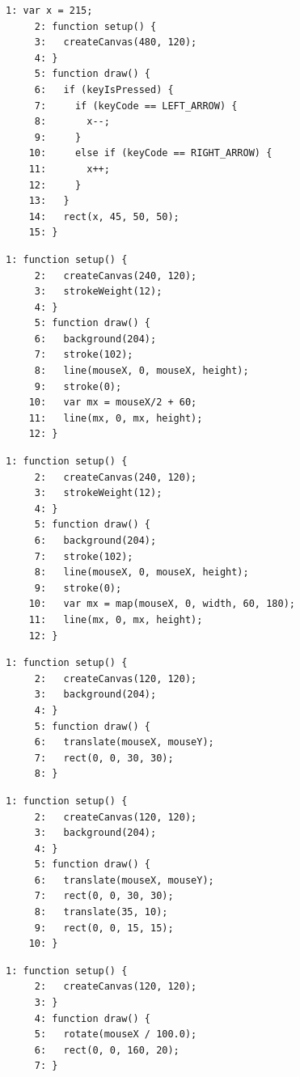 \documentclass[a4j]{ltjsarticle}
\begin{document}
\vspace{1in}
\begin{lstlisting}[caption=Ex\_05\_19.js]
     1: var x = 215;
     2: function setup() {
     3:   createCanvas(480, 120);
     4: }
     5: function draw() {
     6:   if (keyIsPressed) {
     7:     if (keyCode == LEFT_ARROW) {
     8:       x--;
     9:     } 
    10:     else if (keyCode == RIGHT_ARROW) {
    11:       x++;
    12:     }
    13:   }
    14:   rect(x, 45, 50, 50);
    15: }
\end{lstlisting}
\vspace{1in}
\begin{lstlisting}[caption=Ex\_05\_20.js]
     1: function setup() {
     2:   createCanvas(240, 120);
     3:   strokeWeight(12);
     4: }
     5: function draw() {
     6:   background(204);
     7:   stroke(102);
     8:   line(mouseX, 0, mouseX, height);
     9:   stroke(0);
    10:   var mx = mouseX/2 + 60;
    11:   line(mx, 0, mx, height);
    12: }
\end{lstlisting}
\vspace{1in}
\begin{lstlisting}[caption=Ex\_05\_21.js]
     1: function setup() {
     2:   createCanvas(240, 120);
     3:   strokeWeight(12);
     4: }
     5: function draw() {
     6:   background(204);
     7:   stroke(102);
     8:   line(mouseX, 0, mouseX, height);
     9:   stroke(0);
    10:   var mx = map(mouseX, 0, width, 60, 180);
    11:   line(mx, 0, mx, height);
    12: }
\end{lstlisting}
\vspace{1in}
\begin{lstlisting}[caption=Ex\_06\_01.js]
     1: function setup() {
     2:   createCanvas(120, 120);
     3:   background(204);  
     4: }
     5: function draw() {
     6:   translate(mouseX, mouseY);
     7:   rect(0, 0, 30, 30);
     8: }
\end{lstlisting}
\vspace{1in}
\begin{lstlisting}[caption=Ex\_06\_02.js]
     1: function setup() {
     2:   createCanvas(120, 120); 
     3:   background(204);  
     4: }
     5: function draw() {
     6:   translate(mouseX, mouseY);
     7:   rect(0, 0, 30, 30);
     8:   translate(35, 10);
     9:   rect(0, 0, 15, 15);
    10: }
\end{lstlisting}
\vspace{1in}
\begin{lstlisting}[caption=Ex\_06\_03.js]
     1: function setup() {
     2:   createCanvas(120, 120);
     3: }
     4: function draw() {
     5:   rotate(mouseX / 100.0);
     6:   rect(0, 0, 160, 20);
     7: }
\end{lstlisting}
\end{document}
